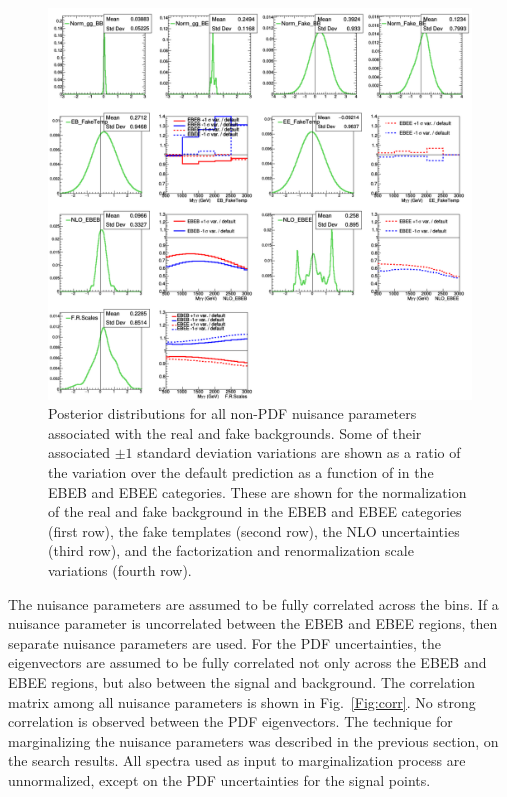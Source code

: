 \begin{figure}[!htbp]
	\centering
	\includegraphics[scale=0.34]{figures/Multi_Rest.pdf}
	\caption{Posterior distributions for all non-PDF nuisance parameters associated with the real and fake backgrounds. Some of their associated $\pm1$ standard deviation variations are shown as a ratio of the variation over the default prediction as a function of \mgg in the EBEB and EBEE categories. These are shown for the normalization of the real and fake background in the EBEB and EBEE categories (first row), the fake templates (second row), the NLO uncertainties (third row), and the factorization and renormalization scale variations (fourth row).}
	\label{fig:Multi_Rest}
\end{figure}

The nuisance parameters are assumed to be fully correlated across the \mgg bins. If a nuisance parameter is uncorrelated between the EBEB and EBEE regions, then separate nuisance parameters are used. For the PDF uncertainties, the eigenvectors are assumed to be fully correlated not only across the EBEB and EBEE regions, but also between the signal and background. The correlation matrix among all nuisance parameters is shown in Fig.~\ref{Fig:corr}. No strong correlation is observed between the PDF eigenvectors. The technique for marginalizing the nuisance parameters was described in the previous section, on the search results. All \mgg spectra used as input to marginalization process are unnormalized, except on the PDF uncertainties for the signal points. 


